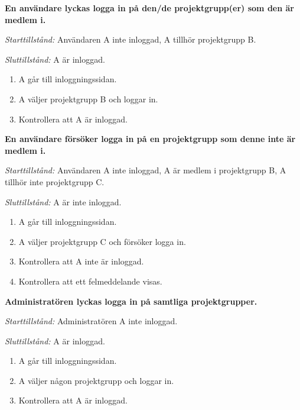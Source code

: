 \documentclass[a4paper]{article}
\begin{document}
\begin{FT}
\item
\textbf{En användare lyckas logga in på den/de projektgrupp(er) som den är medlem i.}

\emph{Starttillstånd:} Användaren A inte inloggad, A tillhör projektgrupp B.

\emph{Sluttillstånd:} A är inloggad.

\begin{enumerate}
\item A går till inloggningssidan.
\item A väljer projektgrupp B och loggar in.
\item Kontrollera att A är inloggad.
\end{enumerate}

\item
\textbf{En användare försöker logga in på en projektgrupp som denne inte är medlem i.}

\emph{Starttillstånd:} Användaren A inte inloggad, A är medlem i projektgrupp B, A tillhör inte projektgrupp C.

\emph{Sluttillstånd:} A är inte inloggad.

\begin{enumerate}
\item A går till inloggningssidan.
\item A väljer projektgrupp C och försöker logga in.
\item Kontrollera att A inte är inloggad.
\item Kontrollera att ett felmeddelande visas.
\end{enumerate}

\item
\textbf{Administratören lyckas logga in på samtliga projektgrupper.}

\emph{Starttillstånd:} Administratören A inte inloggad.

\emph{Sluttillstånd:} A är inloggad.

\begin{enumerate}
\item A går till inloggningssidan.
\item A väljer någon projektgrupp och loggar in.
\item Kontrollera att A är inloggad.
\end{enumerate}
\end{FT}








\end{document}
